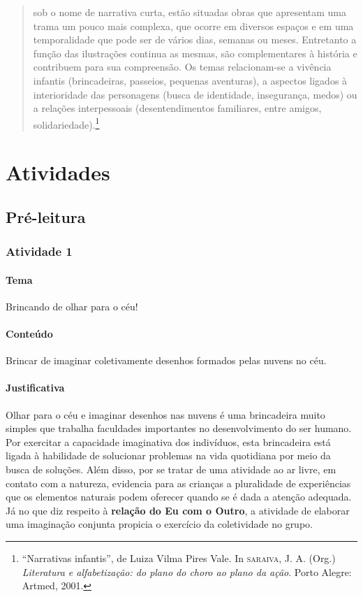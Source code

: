 \documentclass[11pt]{extarticle}
\begin{document}
\begin{quote}
sob o nome de narrativa curta, estão situadas obras que apresentam uma trama 
um pouco mais complexa, que ocorre em diversos espaços e em uma temporalidade 
que pode ser de vários dias, semanas ou meses. Entretanto a função das ilustrações 
continua as mesmas, são complementares à história e contribuem para sua compreensão. 
Os temas relacionam-se a vivência infantis (brincadeiras, passeios, pequenas aventuras), 
a aspectos ligados à interioridade das personagens (busca de identidade, insegurança, 
medos) ou a relações interpessoais (desentendimentos familiares, entre amigos, solidariedade).\footnote{“Narrativas infantis”, de Luiza Vilma Pires Vale. In \textsc{saraiva}, J. A. (Org.) \textit{Literatura e alfabetização: do plano do choro ao plano da ação}. Porto Alegre: Artmed, 2001.} 
\end{quote}

\section{Atividades}

\subsection{Pré-leitura}


\subsubsection{Atividade 1}

\paragraph{Tema} Brincando de olhar para o céu!

\paragraph{Conteúdo} Brincar de imaginar coletivamente desenhos formados pelas nuvens no céu.

\paragraph{Justificativa} Olhar para o céu e imaginar desenhos nas nuvens é uma brincadeira muito 
simples que trabalha faculdades importantes no desenvolvimento do ser humano. Por exercitar a capacidade 
imaginativa dos indivíduos, esta brincadeira está ligada à habilidade de solucionar problemas
na vida quotidiana por meio da busca de soluções. Além disso, por se tratar de uma atividade ao ar livre,
em contato com a natureza, evidencia para as crianças a pluralidade de experiências que 
os elementos naturais podem oferecer quando se é dada a atenção adequada. 
Já no que diz respeito à \textbf{relação do Eu com o Outro}, a atividade de elaborar uma imaginação conjunta
propicia o exercício da coletividade no grupo.
\end{document}

